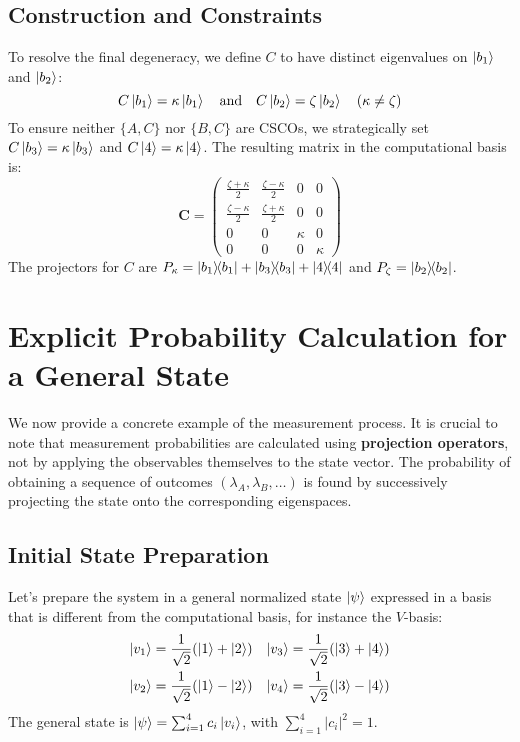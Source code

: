 \documentclass[11pt,a4paper]{article}
\begin{document}
\subsection{Construction and Constraints}
To resolve the final degeneracy, we define $C$ to have distinct eigenvalues on
$\ket{b_1}$ and $\ket{b_2}$:
$$ C\ket{b_1} = \kappa\ket{b_1} \quad \text{and} \quad C\ket{b_2} =
\zeta\ket{b_2} \quad (\kappa \neq \zeta) $$
To ensure neither $\{A,C\}$ nor $\{B,C\}$ are CSCOs, we strategically set
$C\ket{b_3}=\kappa\ket{b_3}$ and $C\ket{4}=\kappa\ket{4}$. The resulting matrix
in the computational basis is:
$$
\mathbf{C} = \begin{pmatrix}
  \frac{\zeta+\kappa}{2} & \frac{\zeta-\kappa}{2} & 0 & 0 \\
  \frac{\zeta-\kappa}{2} & \frac{\zeta+\kappa}{2} & 0 & 0 \\
  0 & 0 & \kappa & 0 \\
  0 & 0 & 0 & \kappa
\end{pmatrix}
$$
The projectors for $C$ are $P_\kappa =
\dyad{b_1}{b_1}+\dyad{b_3}{b_3}+\dyad{4}{4}$ and $P_\zeta = \dyad{b_2}{b_2}$.

\section{Explicit Probability Calculation for a General State}

We now provide a concrete example of the measurement process. It is crucial to
note that measurement probabilities are calculated using \textbf{projection
operators}, not by applying the observables themselves to the state vector. The
probability of obtaining a sequence of outcomes $(\lambda_A, \lambda_B, \dots)$
is found by successively projecting the state onto the corresponding
eigenspaces.

\subsection{Initial State Preparation}
Let's prepare the system in a general normalized state $\ket{\psi}$ expressed in
a basis that is different from the computational basis, for instance the
$V$-basis:
\begin{align*}
  \ket{v_1} &= \frac{1}{\sqrt{2}}(\ket{1} + \ket{2}) & \ket{v_3} &=
  \frac{1}{\sqrt{2}}(\ket{3} + \ket{4}) \\
  \ket{v_2} &= \frac{1}{\sqrt{2}}(\ket{1} - \ket{2}) & \ket{v_4} &=
  \frac{1}{\sqrt{2}}(\ket{3} - \ket{4})
\end{align*}
The general state is $\ket{\psi} = \sum_{i=1}^{4} c_i \ket{v_i}$, with
$\sum_{i=1}^{4} |c_i|^2 = 1$.
\end{document}
